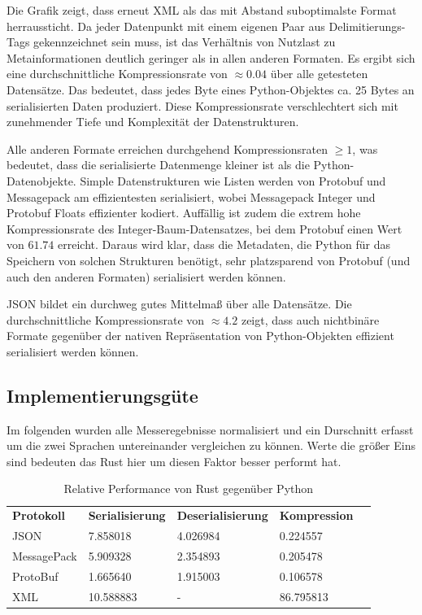 \documentclass[ngerman]{seminarvorlage}
\begin{document}
Die Grafik zeigt, dass erneut XML als das mit Abstand suboptimalste Format herraussticht. Da jeder Datenpunkt mit einem eigenen Paar aus Delimitierungs-Tags gekennzeichnet sein muss, ist das Verhältnis von Nutzlast zu Metainformationen deutlich geringer als in allen anderen Formaten. Es ergibt sich eine durchschnittliche Kompressionsrate von $\approx 0.04$ über alle getesteten Datensätze. Das bedeutet, dass jedes Byte eines Python-Objektes ca. 25 Bytes an serialisierten Daten produziert. Diese Kompressionsrate verschlechtert sich mit zunehmender Tiefe und Komplexität der Datenstrukturen.

Alle anderen Formate erreichen durchgehend Kompressionsraten $\geq 1$, was bedeutet, dass die serialisierte Datenmenge kleiner ist als die Python-Datenobjekte. Simple Datenstrukturen wie Listen werden von Protobuf und Messagepack am effizientesten serialisiert, wobei Messagepack Integer und Protobuf Floats effizienter kodiert. Auffällig ist zudem die extrem hohe Kompressionsrate des Integer-Baum-Datensatzes, bei dem Protobuf einen Wert von $61.74$ erreicht. Daraus wird klar, dass die Metadaten, die Python für das Speichern von solchen Strukturen benötigt, sehr platzsparend von Protobuf (und auch den anderen Formaten) serialisiert werden können.

JSON bildet ein durchweg gutes Mittelmaß über alle Datensätze. Die durchschnittliche Kompressionsrate von $\approx 4.2$ zeigt, dass auch nichtbinäre Formate gegenüber der nativen Repräsentation von Python-Objekten effizient serialisiert werden können.

\newpage

\subsection{Implementierungsgüte}
Im folgenden wurden alle Messeregebnisse normalisiert und ein Durschnitt erfasst um die zwei Sprachen untereinander vergleichen zu können. Werte die größer Eins sind bedeuten das Rust hier um diesen Faktor besser performt hat.

\begin{table}[H]
    \begin{tabular}{|l|l|l|l|l}
    \cline{1-4}
    \textbf{Protokoll} & \textbf{Serialisierung} & \textbf{Deserialisierung} & \textbf{Kompression} &  \\ \cline{1-4}
    JSON               & 7.858018                & 4.026984                  & 0.224557               &  \\ \cline{1-4}
    MessagePack        & 5.909328                & 2.354893                  & 0.205478               &  \\ \cline{1-4}
    ProtoBuf           & 1.665640                & 1.915003                  & 0.106578               &  \\ \cline{1-4}
    XML                & 10.588883               & -                         & 86.795813              &  \\ \cline{1-4}
    \end{tabular}
    \caption{Relative Performance von Rust gegenüber Python}
\end{table}
\end{document}
